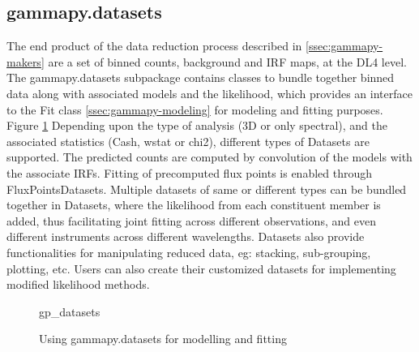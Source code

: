 \subsection{gammapy.datasets}
\label{ssec:gammapy-datasets}

The end product of the data reduction process described in \ref{ssec:gammapy-makers} are a set of binned counts, background and IRF maps, at the DL4 level. The gammapy.datasets subpackage contains classes to bundle together binned data along with associated models and the likelihood, which provides an interface to the Fit class \ref{ssec:gammapy-modeling} for modeling and fitting purposes. Figure \ref{fig*:minted:gp_datasets} Depending upon the type of analysis (3D or only spectral), and the associated statistics (Cash, wstat or chi2), different types of Datasets are supported. The predicted counts are computed by convolution of the models with the associate IRFs. Fitting of precomputed flux points is enabled through FluxPointsDatasets. Multiple datasets of same or different types can be  bundled together in Datasets, where the likelihood from each constituent member is added, thus facilitating joint fitting across different observations, and even different instruments across different wavelengths. Datasets also provide functionalities for manipulating reduced data, eg: stacking, sub-grouping, plotting, etc. Users can also create their customized datasets for implementing modified likelihood methods. 

\begin{figure}
	{gp_datasets}
	\caption{Using gammapy.datasets for modelling and fitting}
	\label{fig*:minted:gp_datasets}
\end{figure}

